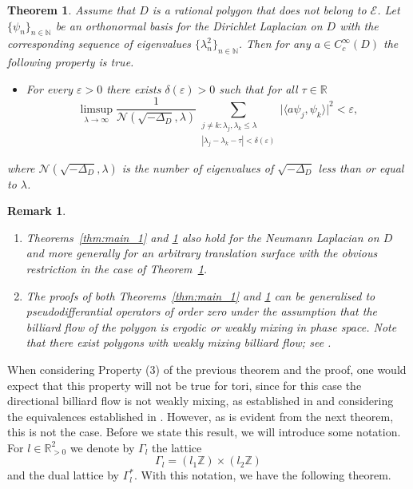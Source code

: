 \documentclass[10pt,a4paper]{amsart}
\newcommand{\R}{\mathbb{R}}
\newcommand{\N}{\mathbb{N}}
\newcommand{\Z}{\mathbb{Z}}
\newcommand{\1}{\mathrm{\mathbf{1}}}
\numberwithin{equation}{section}
\newtheorem{theorem}[thm]{Theorem}
\newtheorem{remark}[thm]{Remark}
\begin{document}
\begin{theorem}\label{thm:main_2}
    Assume that $D$ is a rational polygon that does not belong to $\mathcal{E}$. Let $\{\psi_n\}_{n\in\N}$ be an orthonormal basis for the Dirichlet Laplacian on $D$ with the corresponding sequence of eigenvalues $\{\lambda_n^2\}_{n\in\N}$. Then for any $a\in C^\infty_c(D)$ the following property is true.  
    \begin{itemize}
        \item[$(3)$]
        For every $\varepsilon>0$ there exists $\delta(\varepsilon)>0$ such that for all $\tau\in\R$
        \begin{equation*}
        \limsup_{\lambda\rightarrow \infty}\frac{1}{\mathcal{N}(\sqrt{-\Delta_D},\lambda)} \sum_{\substack{j\neq k: \lambda_j,\lambda_k\leq \lambda  \\ |\lambda_{j}-\lambda_{k}-\tau| < \delta(\varepsilon)}} \big| \langle a \psi_j , \psi_k\rangle  \big|^2 <\varepsilon,
        \end{equation*}
    \end{itemize}
    where $\mathcal{N}(\sqrt{-\Delta_D},\lambda)$ is the number of eigenvalues of $\sqrt{-\Delta_D}$ less than or equal to $\lambda$. 
\end{theorem}

\begin{remark}
$ $ \\ 
\vspace{-1em}
\begin{enumerate}[label=\textnormal{(\roman*)}]
    \item  Theorems~\ref{thm:main_1} and \ref{thm:main_2} also hold for the Neumann Laplacian on $D$ and more generally for an arbitrary translation surface with the obvious restriction in the case of Theorem~\ref{thm:main_2}.

    \item The proofs of both Theorems~\ref{thm:main_1} and \ref{thm:main_2} can be generalised to pseudodifferantial operators of order zero under the assumption that the billiard flow of the polygon is ergodic or weakly mixing in phase space. Note that there exist polygons with weakly mixing billiard flow; see \cite{MR5067163}.
\end{enumerate}
\end{remark}

When considering Property (3) of the previous theorem and the proof, one would expect that this property will not be true for tori, since for this case the directional billiard flow is not weakly mixing, as established in \cite{aranaherrera2024weakmixingrationalbilliards} and considering the equivalences established in \cite{Zel05}. However, as is evident from the next theorem, this is not the case. Before we state this result, we will introduce some notation. For $l\in \R^2_{>0}$ we denote by $\Gamma_l$ the lattice
\begin{equation*}
    \Gamma_l = ( l_1 \Z) \times ( l_2 \Z)
\end{equation*}
and the dual lattice by $\Gamma_l^{*}$. With this notation, we have the following theorem.
\end{document}
